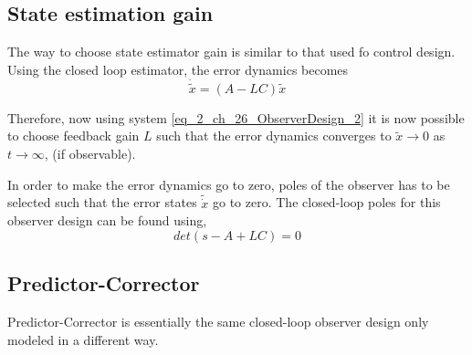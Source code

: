 \subsection{State estimation gain}

The way to choose state estimator gain is similar to that used fo control design. Using the closed loop estimator, the error dynamics becomes
\begin{equation}
	\dot{\tilde{x}} = (A - LC)\tilde{x}
\end{equation}

Therefore, now using system \eqref{eq_2_ch_26_ObserverDesign_2} it is now possible to choose feedback gain $L$ such that the error dynamics converges to $\tilde{x} \rightarrow 0$ as $t \rightarrow \infty$, (if observable).

In order to make the error dynamics go to zero, poles of the observer has to be selected such that the error states $\tilde{\dot{x}}$ go to zero. The closed-loop poles for this observer design can be found using,
\begin{equation} \label{Eq_2_ch_26_ObseverGainPoles}
det(s - A + LC) = 0
\end{equation}

\subsection{Predictor-Corrector}

Predictor-Corrector is essentially the same closed-loop observer design only modeled in a different way.

